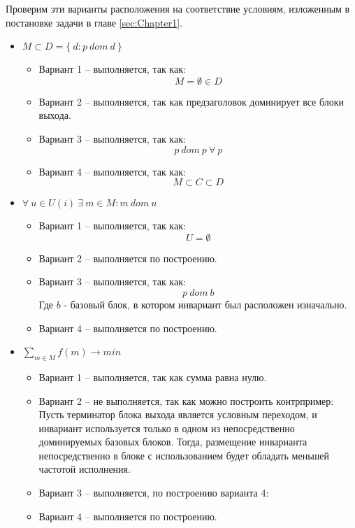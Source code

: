 Проверим эти варианты расположения на соответствие условиям, изложенным в постановке задачи в главе \ref{sec:Chapter1}.

\begin{itemize}
    \item $M \subset D = \{ \: d : p \: dom \: d \: \}$
        \begin{itemize}
            \item Вариант 1 -- выполняется, так как:
                $$ M = \emptyset \in D $$
            \item Вариант 2 -- выполняется, так как предзаголовок доминирует все блоки выхода.
            \item Вариант 3 -- выполняется, так как:
                $$ p \: dom \: p \: \forall \: p $$
            \item Вариант 4 -- выполняется, так как:
                $$M \subset C \subset D$$
        \end{itemize}
    \item $\forall \: u \in U(i) \: \exists \: m \in M : m \: dom \: u $
        \begin{itemize}
            \item Вариант 1 -- выполняется, так как:
                $$ U = \emptyset $$
            \item Вариант 2 -- выполняется по построению.
            \item Вариант 3 -- выполняется, так как:
                $$ p \: dom \: b $$
                Где $b$ - базовый блок, в котором инвариант был расположен изначально.
            \item Вариант 4 -- выполняется по построению.
        \end{itemize}
    \item $\sum_{m \in M}{f(m)} \to min $
        \begin{itemize}
            \item Вариант 1 -- выполняется, так как сумма равна нулю.
            \item Вариант 2 -- не выполняется, так как можно построить контрпример:
                Пусть терминатор блока выхода является условным переходом, и инвариант используется только в одном из непосредственно доминируемых базовых блоков.
                Тогда, размещение инварианта непосредственно в блоке с использованием будет обладать меньшей частотой исполнения.
            \item Вариант 3 -- выполняется, по построению варианта 4:
            \item Вариант 4 -- выполняется по построению.
        \end{itemize}
\end{itemize}

